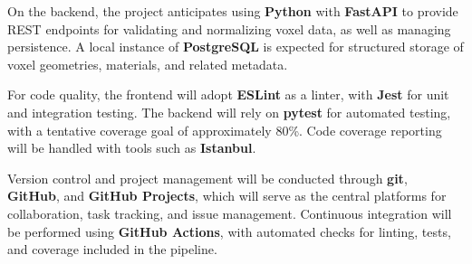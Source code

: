 \documentclass{article}
\begin{document}
On the backend, the project anticipates using \textbf{Python} with
\textbf{FastAPI} to provide REST endpoints for validating and normalizing voxel
data, as well as managing persistence. A local instance of
\textbf{PostgreSQL} is expected for structured storage of voxel geometries,
materials, and related metadata.

For code quality, the frontend will adopt \textbf{ESLint} as a linter, with
\textbf{Jest} for unit and integration testing. The backend will rely on
\textbf{pytest} for automated testing, with a tentative coverage goal of
approximately 80\%. Code coverage reporting will be handled with tools such as
\textbf{Istanbul}.

Version control and project management will be conducted through
\textbf{git}, \textbf{GitHub}, and \textbf{GitHub Projects}, which will serve
as the central platforms for collaboration, task tracking, and issue
management. Continuous integration will be performed using
\textbf{GitHub Actions}, with automated checks for linting, tests, and coverage
included in the pipeline.





\end{document}
